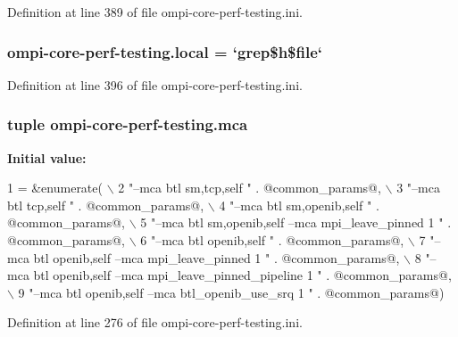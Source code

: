 Definition at line 389 of file ompi-\/core-\/perf-\/testing.\-ini.

\hypertarget{namespaceompi-core-perf-testing_a4a086e4123b85a46d9c48273cca50851}{
\subsubsection[{local}]{\setlength{\rightskip}{0pt plus 5cm}ompi-\/core-\/perf-\/testing.\-local = `grep\$h\$file`}}\label{namespaceompi-core-perf-testing_a4a086e4123b85a46d9c48273cca50851}


Definition at line 396 of file ompi-\/core-\/perf-\/testing.\-ini.

\hypertarget{namespaceompi-core-perf-testing_a3057dee49d2981bae3a0bc69987f7b43}{
\subsubsection[{mca}]{\setlength{\rightskip}{0pt plus 5cm}tuple ompi-\/core-\/perf-\/testing.\-mca}}\label{namespaceompi-core-perf-testing_a3057dee49d2981bae3a0bc69987f7b43}
{\bfseries Initial value\-:}
\begin{DoxyCode}
1 = &enumerate( \(\backslash\)
2         \textcolor{stringliteral}{"--mca btl sm,tcp,self "} . @common\_params@, \(\backslash\)
3         \textcolor{stringliteral}{"--mca btl tcp,self "} . @common\_params@, \(\backslash\)
4         \textcolor{stringliteral}{"--mca btl sm,openib,self "} . @common\_params@, \(\backslash\)
5         \textcolor{stringliteral}{"--mca btl sm,openib,self --mca mpi\_leave\_pinned 1 "} . @common\_params@, \(\backslash\)
6         \textcolor{stringliteral}{"--mca btl openib,self "} . @common\_params@, \(\backslash\)
7         \textcolor{stringliteral}{"--mca btl openib,self --mca mpi\_leave\_pinned 1 "} . @common\_params@, \(\backslash\)
8         \textcolor{stringliteral}{"--mca btl openib,self --mca mpi\_leave\_pinned\_pipeline 1 "} . @common\_params@, \(\backslash\)
9         \textcolor{stringliteral}{"--mca btl openib,self --mca btl\_openib\_use\_srq 1 "} . @common\_params@)
\end{DoxyCode}


Definition at line 276 of file ompi-\/core-\/perf-\/testing.\-ini.

